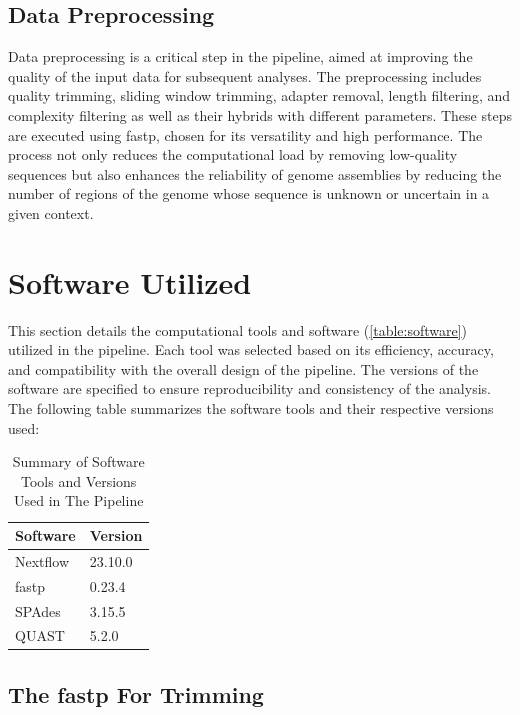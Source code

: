 \subsection{Data Preprocessing}

Data preprocessing is a critical step in the pipeline, aimed at improving the quality of the input data for subsequent analyses. The preprocessing includes quality \gls{trimming}, sliding window \gls{trimming}, adapter removal, length filtering, and complexity filtering as well as their hybrids with different parameters. These steps are executed using fastp, chosen for its versatility and high performance. The process not only reduces the computational load by removing low-quality sequences but also enhances the reliability of \gls{genome} assemblies by reducing the number of regions of the \gls{genome} whose sequence is unknown or uncertain in a given context.



\section{Software Utilized}

This section details the computational tools and software (\autoref{table:software}) utilized in the pipeline. Each tool was selected based on its efficiency, accuracy, and compatibility with the overall design of the pipeline. The versions of the software are specified to ensure reproducibility and consistency of the analysis. The following table summarizes the software tools and their respective versions used:

\begin{table}[ht]
\centering
\begin{tabular}{l l}
\hline
\textbf{Software} & \textbf{Version} \\ \hline
Nextflow & 23.10.0 \\
fastp & 0.23.4 \\
SPAdes & 3.15.5 \\
QUAST & 5.2.0 \\ \hline
\end{tabular}
\caption{Summary of Software Tools and Versions Used in The Pipeline}
\label{table:software}
\end{table}

\subsection{The fastp For Trimming}

